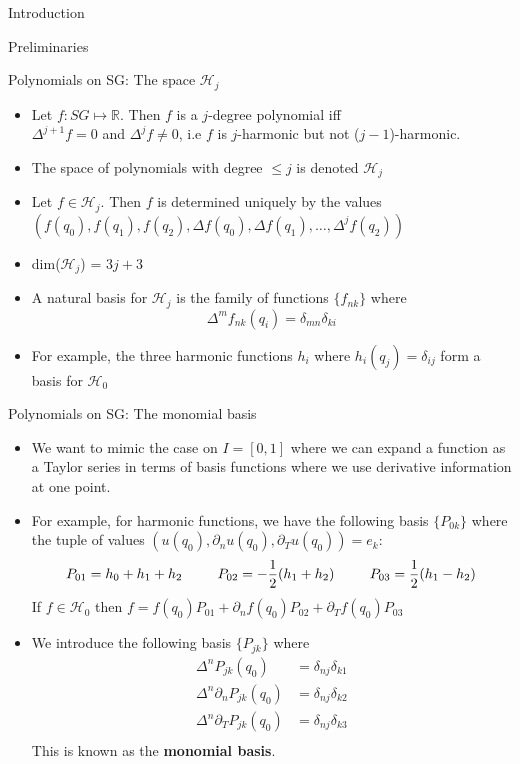\documentclass[xcolor = dvipsnames]{beamer}
\begin{document}
\begin{section}{Introduction}
\begin{frame}{Preliminaries}
\begin{itemize}
    \end{itemize}
\end{frame}
\begin{frame}{Polynomials on SG: The space $\mathcal{H}_j$}
    \begin{itemize}
        \item Let $f: SG \mapsto \mathbb{R}$. Then $f$ is a $j$-degree polynomial iff\\
        $\Delta^{j+1}f = 0$ and $\Delta^{j}f\neq 0$, i.e $f$ is $j$-harmonic but not ($j-1$)-harmonic. 
        \pause
        \item The space of polynomials with degree $\le j$ is denoted $\mathcal{H}_{j}$
        \pause
        \item Let $f \in \mathcal{H}_j$. Then $f$ is determined uniquely by the values $(f(q_0), f(q_1), f(q_2), \Delta f(q_0), \Delta f(q_1), \ldots, \Delta^jf(q_2))$
        \pause
        \item dim($\mathcal{H}_j$) = $3j + 3$
        \pause
        \item A natural basis for $\mathcal{H}_{j}$ is the family of functions $\{f_{nk}\}$ where 
        $$ \Delta^{m}f_{nk}(q_i) = \delta_{mn}\delta_{ki}$$
        \pause
        \item For example, the three harmonic functions $h_i$ where $h_i(q_j) = \delta_{ij}$ form a basis for $\mathcal{H}_0$
    \end{itemize}
\end{frame}

\begin{frame}{Polynomials on SG: The monomial basis}
    \begin{itemize}
        \item We want to mimic the case on $I = [0,1]$ where we can expand a function as a Taylor series in terms of basis functions where we use derivative information at one point. 
        \pause
        \item For example, for harmonic functions, we have the following basis $\{P_{0k}\}$ where the tuple of values $(u(q_0), \partial_nu(q_0), \partial_Tu(q_0)) = e_k$:
        $$ P_{01} = h_0 + h_1 + h_2 \hspace{0.35in} P_{02} = -\frac{1}{2}(h_1 + h_2) \hspace{0.35in} P_{03} = \frac{1}{2}(h_1 - h_2) $$
         If $f \in \mathcal{H}_0$ then $f = f(q_0)P_{01} + \partial_nf(q_0)P_{02} + \partial_Tf(q_0)P_{03}$
        \pause
        \item We introduce the following basis $\{P_{jk}\}$ where
        \begin{align*}
            \Delta^nP_{jk}(q_0) &= \delta_{nj}\delta_{k1}\\
            \Delta^n\partial_nP_{jk}(q_0) &= \delta_{nj}\delta_{k2}\\
            \Delta^n\partial_TP_{jk}(q_0) &= \delta_{nj}\delta_{k3}\\
        \end{align*}
        This is known as the \textbf{monomial basis}. 
    \end{itemize} 
\end{frame}



\end{section}
\end{document}
